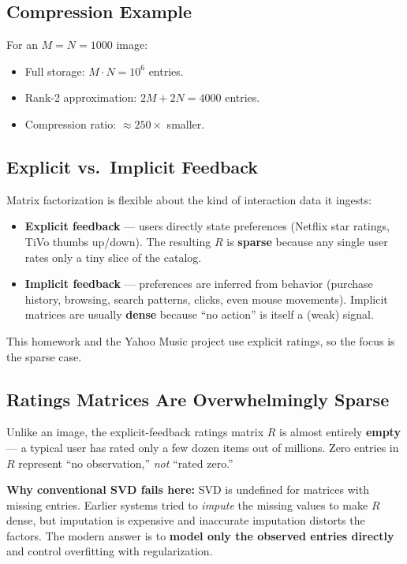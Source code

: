 \documentclass[11pt]{article}
\begin{document}
\subsection{Compression Example}
For an $M = N = 1000$ image:
\begin{itemize}
    \item Full storage: $M \cdot N = 10^{6}$ entries.
    \item Rank-2 approximation: $2M + 2N = 4000$ entries.
    \item Compression ratio: $\approx 250\times$ smaller.
\end{itemize}

\subsection{Explicit vs.\ Implicit Feedback}
Matrix factorization is flexible about the kind of interaction data it ingests:
\begin{itemize}
    \item \textbf{Explicit feedback} --- users directly state preferences (Netflix star ratings, TiVo thumbs up/down). The resulting $R$ is \textbf{sparse} because any single user rates only a tiny slice of the catalog.
    \item \textbf{Implicit feedback} --- preferences are inferred from behavior (purchase history, browsing, search patterns, clicks, even mouse movements). Implicit matrices are usually \textbf{dense} because ``no action'' is itself a (weak) signal.
\end{itemize}
This homework and the Yahoo Music project use explicit ratings, so the focus is the sparse case.

\subsection{Ratings Matrices Are Overwhelmingly Sparse}
Unlike an image, the explicit-feedback ratings matrix $R$ is almost entirely \textbf{empty} --- a typical user has rated only a few dozen items out of millions. Zero entries in $R$ represent ``no observation,'' \emph{not} ``rated zero.''

\textbf{Why conventional SVD fails here:} SVD is undefined for matrices with missing entries. Earlier systems tried to \emph{impute} the missing values to make $R$ dense, but imputation is expensive and inaccurate imputation distorts the factors. The modern answer is to \textbf{model only the observed entries directly} and control overfitting with regularization.
\end{document}
